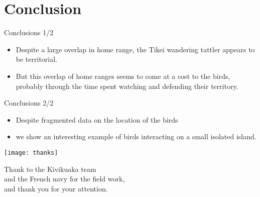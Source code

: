 \documentclass[10pt,compress]{beamer}
\begin{document}
\section{Conclusion}

\begin{frame}{Conclusions 1/2}
  \begin{itemize}
  \item Despite a large overlap in home range, the Tikei wandering tattler appears to be territorial. 
  \item But this overlap of home ranges seems to come at a cost to the birds, probably through the time spent watching and defending their territory.
  \end{itemize}
\end{frame}

\begin{frame}{Conclusions 2/2}
  \begin{itemize}
  \item Despite fragmented data on the location of the birds
  \item we show an interesting example of birds interacting on a small isolated island.
  \end{itemize}
\end{frame}



\begin{frame}[plain]
  \begin{center}
    \texttt{[image: thanks]} \\
    \vspace{6pt}
   
      Thank to the Kivikuaka team \\and the French navy
      for the field work, \\and thank you for your attention.
   
  \end{center}
\end{frame}


%    
%    
% 
\end{document}
